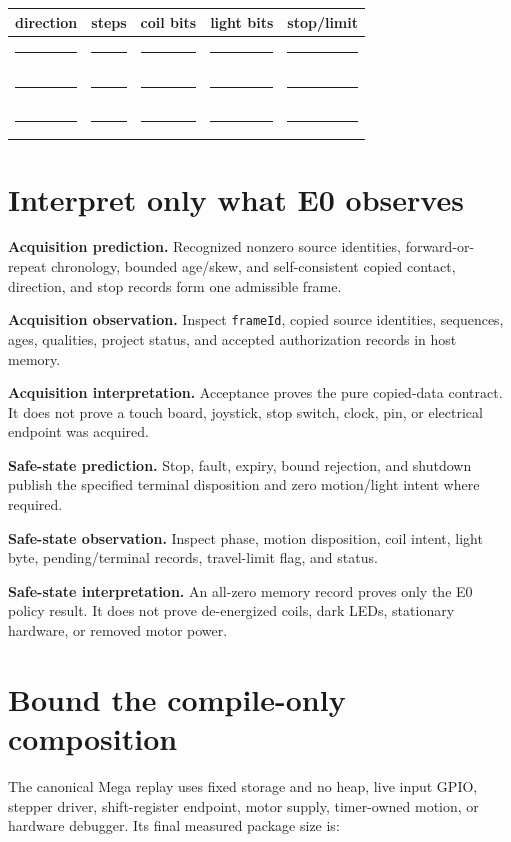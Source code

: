 \documentclass[10pt]{article}
\newcommand{\blankline}{\rule{0.75in}{0.4pt}}
\begin{document}
\begin{tabularx}{\linewidth}{@{}X X X X X@{}}
\toprule
direction & steps & coil bits & light bits & stop/limit\\
\midrule
\rule{0pt}{16pt}\blankline & \blankline & \blankline & \blankline & \blankline\\[9pt]
\blankline & \blankline & \blankline & \blankline & \blankline\\[9pt]
\blankline & \blankline & \blankline & \blankline & \blankline\\
\bottomrule
\end{tabularx}

\section{Interpret only what E0 observes}
\textbf{Acquisition prediction.} Recognized nonzero source identities,
forward-or-repeat chronology, bounded age/skew, and self-consistent copied
contact, direction, and stop records form one admissible frame.

\textbf{Acquisition observation.} Inspect \texttt{frameId}, copied source
identities, sequences, ages, qualities, project status, and accepted
authorization records in host memory.

\textbf{Acquisition interpretation.} Acceptance proves the pure copied-data
contract. It does not prove a touch board, joystick, stop switch, clock, pin,
or electrical endpoint was acquired.

\textbf{Safe-state prediction.} Stop, fault, expiry, bound rejection, and
shutdown publish the specified terminal disposition and zero motion/light
intent where required.

\textbf{Safe-state observation.} Inspect phase, motion disposition, coil
intent, light byte, pending/terminal records, travel-limit flag, and status.

\textbf{Safe-state interpretation.} An all-zero memory record proves only the
E0 policy result. It does not prove de-energized coils, dark LEDs, stationary
hardware, or removed motor power.

\section{Bound the compile-only composition}
The canonical Mega replay uses fixed storage and no heap, live input GPIO,
stepper driver, shift-register endpoint, motor supply, timer-owned motion, or
hardware debugger. Its final measured package size is:
\end{document}
